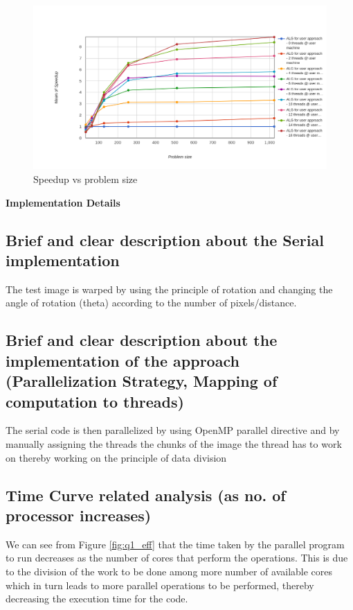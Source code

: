 \documentclass[runningheads, a4paper, oribibl]{llncs}
\begin{document}
\begin{figure}[h!]
    \centering
    \includegraphics[scale = 0.3]{q1/mean_speedup.png}
    \caption{Speedup vs problem size}
    \label{fig:q1_speedup}
\end{figure}


\textbf{Implementation Details}
\subsection{Brief and clear description about the Serial implementation}
The test image is warped by using the principle of rotation and changing the angle of rotation (theta) according to the number of pixels/distance.

\subsection{Brief and clear description about the implementation of the approach (Parallelization Strategy, Mapping of computation to threads)}
The serial code is then parallelized by using OpenMP parallel directive and by manually assigning the threads the chunks of the image the thread has to work on thereby working on the principle of data division

\subsection{Time Curve related analysis (as no. of processor increases)}
We can see from Figure \ref{fig:q1_eff} that the time taken by the parallel program to run decreases as the number of cores that perform the operations. This is due to the division of the work to be done among more number of available cores which in turn leads to more parallel operations to be performed, thereby decreasing the execution time for the code.
\end{document}

